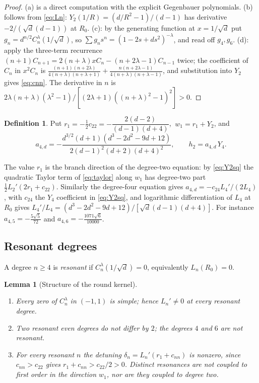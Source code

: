\documentclass[11pt]{amsart}
\numberwithin{equation}{section}
\newtheorem{lemma}[theorem]{Lemma}
\theoremstyle{definition}
\newtheorem{definition}[theorem]{Definition}
\theoremstyle{remark}
\begin{document}
\begin{proof}
(a) is a direct computation with the explicit Gegenbauer polynomials. (b) follows from \eqref{eq:Ln}: $Y_2(1/R)=(d/R^2-1)/(d-1)$ has derivative $-2/(\sqrt d(d-1))$ at $R_0$. (c): by the generating function at $x=1/\sqrt d$ put $g_n=d^{n/2}C_n^\lambda(1/\sqrt d)$, so $\sum g_ns^n=(1-2s+ds^2)^{-\lambda}$, and read off $g_4,g_6$. (d): apply the three-term recurrence $(n+1)C_{n+1}=2(n+\lambda)xC_n-(n+2\lambda-1)C_{n-1}$ twice; the coefficient of $C_n$ in $x^2C_n$ is $\frac{(n+1)(n+2\lambda)}{4(n+\lambda)(n+\lambda+1)}+\frac{n(n+2\lambda-1)}{4(n+\lambda)(n+\lambda-1)}$, and substitution into $Y_2$ gives \eqref{eq:cnn}. The derivative in $n$ is $2\lambda(n+\lambda)(\lambda^2-1)/[(2\lambda+1)((n+\lambda)^2-1)^2]>0$.
\end{proof}

\begin{definition}\label{def:r1}
Put $r_1=-\tfrac12c_{22}=-\dfrac{2(d-2)}{(d-1)(d+4)}$, $\ w_1=r_1+Y_2$, and
\[
a_{4,d}=-\frac{d^{3/2}(d+1)(d^3-2d^2-9d+12)}{2(d-1)^2(d+2)(d+4)^2},\qquad h_2=a_{4,d}\,Y_4.
\]
\end{definition}
The value $r_1$ is the branch direction of the degree-two equation: by \eqref{eq:Y2sq} the quadratic Taylor term of \eqref{eq:taylor} along $w_1$ has degree-two part $\frac12L_2'(2r_1+c_{22})$. Similarly the degree-four equation gives $a_{4,d}=-c_{24}L_4'/(2L_4)$, with $c_{24}$ the $Y_4$ coefficient in \eqref{eq:Y2sq}, and logarithmic differentiation of $L_4$ at $R_0$ gives $L_4'/L_4=(d^3-2d^2-9d+12)/[\sqrt d(d-1)(d+4)]$. For instance $a_{4,5}=-\tfrac{5\sqrt5}{72}$ and $a_{4,6}=-\tfrac{1071\sqrt6}{10000}$.

\subsection{Resonant degrees}
A degree $n\ge4$ is \emph{resonant} if $C_n^\lambda(1/\sqrt d)=0$, equivalently $L_n(R_0)=0$.

\begin{lemma}[Structure of the round kernel]\label{lem:kernel}
\begin{enumerate}[label=\textup{(\alph*)}]
\item Every zero of $C_n^\lambda$ in $(-1,1)$ is simple; hence $L_n'\ne0$ at every resonant degree.
\item Two resonant even degrees do not differ by $2$; the degrees $4$ and $6$ are not resonant.
\item For every resonant $n$ the detuning $\delta_n=L_n'(r_1+c_{nn})$ is nonzero, since $c_{nn}>c_{22}$ gives $r_1+c_{nn}>c_{22}/2>0$. Distinct resonances are not coupled to first order in the direction $w_1$, nor are they coupled to degree two.
\end{enumerate}
\end{lemma}
\end{document}
